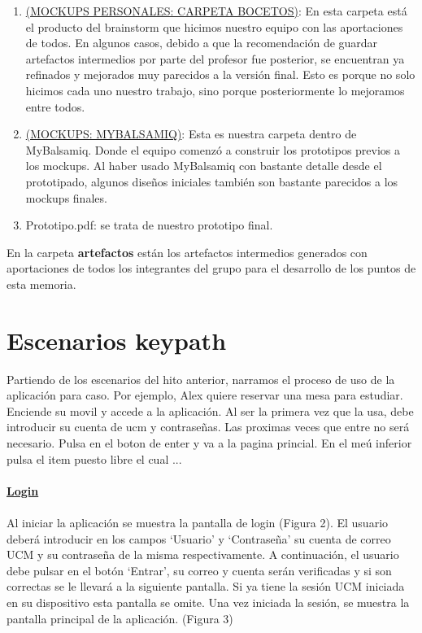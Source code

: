 \documentclass[12pt]{article}
\begin{document}
\begin{enumerate}
\item \href{https://drive.google.com/open?id=147zao3EmZsQRw81fojuigk7AfHRFlDBY}{(MOCKUPS PERSONALES: CARPETA BOCETOS)}: En esta carpeta está el producto del brainstorm que hicimos nuestro equipo con las aportaciones de todos. En algunos casos, debido a que la recomendación de guardar artefactos intermedios por parte del profesor fue posterior, se encuentran ya refinados y mejorados muy parecidos a la versión final. Esto es porque no solo hicimos cada uno nuestro trabajo, sino porque posteriormente lo mejoramos entre todos.


\item \href{https://ucm-dsi.mybalsamiq.com/projects/1819-b-proyecto-g04/grid}{(MOCKUPS: MYBALSAMIQ)}: Esta es nuestra carpeta dentro de MyBalsamiq. Donde el equipo comenzó a construir los prototipos previos a los mockups. Al haber usado MyBalsamiq con bastante detalle desde el prototipado, algunos diseños iniciales también son bastante parecidos a los mockups finales.

\item Prototipo.pdf: se trata de nuestro prototipo final.

\end{enumerate}

\indent En la carpeta \textbf{artefactos} están los artefactos intermedios generados con aportaciones de todos los integrantes del grupo para el desarrollo de los puntos de esta memoria.

\newpage

\section{Escenarios keypath}

Partiendo de los escenarios del hito anterior, narramos el proceso de uso de la aplicación para caso. Por ejemplo, Alex quiere reservar una mesa para estudiar. Enciende su movil y accede a la aplicación. Al ser la primera vez que la usa, debe introducir su cuenta de ucm y contraseñas. Las proximas veces que entre no será necesario. Pulsa en el boton de enter y va a la pagina princial. En el meú inferior pulsa el item puesto libre el cual ... 
\\\\
\indent \textbf{\underline{Login}} \\
 \\
\indent Al iniciar la aplicación se muestra la pantalla de login (Figura 2). El usuario deberá introducir en los campos ‘Usuario’ y ‘Contraseña’ su cuenta de correo UCM y su contraseña de la misma respectivamente. A continuación, el usuario debe pulsar en el botón ‘Entrar’, su correo y cuenta serán verificadas y si son correctas se le llevará a la siguiente pantalla. Si ya tiene la sesión UCM iniciada en su dispositivo esta pantalla se omite. Una vez iniciada la sesión, se muestra la pantalla principal de la aplicación. (Figura 3)\\
\end{document}
